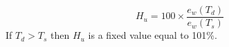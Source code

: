 \[
H_u = 100 \times \frac{ e_w(T_d)}{e_w(T_s)} 
\]
If $T_d > T_s$ then $H_u$ is a fixed value equal to 101\%.

